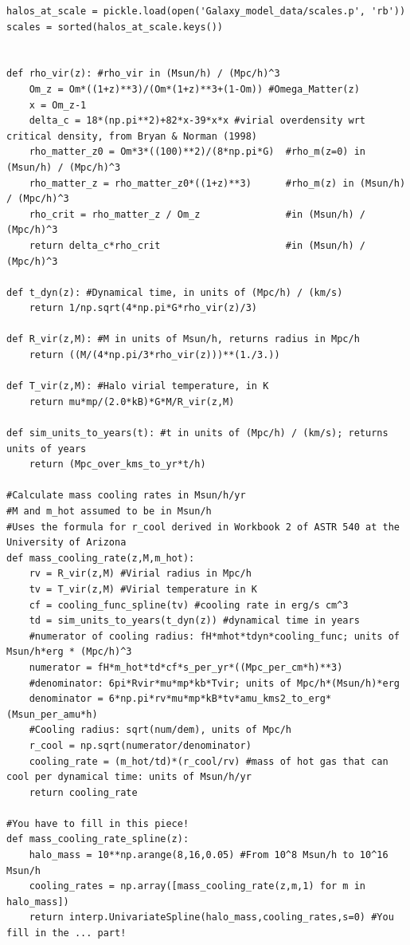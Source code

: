 \documentclass[onecolumn]{aastex62}
\begin{document}
\begin{verbatim}
halos_at_scale = pickle.load(open('Galaxy_model_data/scales.p', 'rb'))
scales = sorted(halos_at_scale.keys())


def rho_vir(z): #rho_vir in (Msun/h) / (Mpc/h)^3
    Om_z = Om*((1+z)**3)/(Om*(1+z)**3+(1-Om)) #Omega_Matter(z)
    x = Om_z-1
    delta_c = 18*(np.pi**2)+82*x-39*x*x #virial overdensity wrt critical density, from Bryan & Norman (1998)
    rho_matter_z0 = Om*3*((100)**2)/(8*np.pi*G)  #rho_m(z=0) in (Msun/h) / (Mpc/h)^3
    rho_matter_z = rho_matter_z0*((1+z)**3)      #rho_m(z) in (Msun/h) / (Mpc/h)^3
    rho_crit = rho_matter_z / Om_z               #in (Msun/h) / (Mpc/h)^3
    return delta_c*rho_crit                      #in (Msun/h) / (Mpc/h)^3

def t_dyn(z): #Dynamical time, in units of (Mpc/h) / (km/s)
    return 1/np.sqrt(4*np.pi*G*rho_vir(z)/3)

def R_vir(z,M): #M in units of Msun/h, returns radius in Mpc/h
    return ((M/(4*np.pi/3*rho_vir(z)))**(1./3.))

def T_vir(z,M): #Halo virial temperature, in K
    return mu*mp/(2.0*kB)*G*M/R_vir(z,M)

def sim_units_to_years(t): #t in units of (Mpc/h) / (km/s); returns units of years
    return (Mpc_over_kms_to_yr*t/h)

#Calculate mass cooling rates in Msun/h/yr
#M and m_hot assumed to be in Msun/h
#Uses the formula for r_cool derived in Workbook 2 of ASTR 540 at the University of Arizona
def mass_cooling_rate(z,M,m_hot):
    rv = R_vir(z,M) #Virial radius in Mpc/h
    tv = T_vir(z,M) #Virial temperature in K
    cf = cooling_func_spline(tv) #cooling rate in erg/s cm^3
    td = sim_units_to_years(t_dyn(z)) #dynamical time in years
    #numerator of cooling radius: fH*mhot*tdyn*cooling_func; units of Msun/h*erg * (Mpc/h)^3
    numerator = fH*m_hot*td*cf*s_per_yr*((Mpc_per_cm*h)**3)
    #denominator: 6pi*Rvir*mu*mp*kb*Tvir; units of Mpc/h*(Msun/h)*erg
    denominator = 6*np.pi*rv*mu*mp*kB*tv*amu_kms2_to_erg*(Msun_per_amu*h)
    #Cooling radius: sqrt(num/dem), units of Mpc/h
    r_cool = np.sqrt(numerator/denominator)
    cooling_rate = (m_hot/td)*(r_cool/rv) #mass of hot gas that can cool per dynamical time: units of Msun/h/yr
    return cooling_rate

#You have to fill in this piece!
def mass_cooling_rate_spline(z):
    halo_mass = 10**np.arange(8,16,0.05) #From 10^8 Msun/h to 10^16 Msun/h
    cooling_rates = np.array([mass_cooling_rate(z,m,1) for m in halo_mass])
    return interp.UnivariateSpline(halo_mass,cooling_rates,s=0) #You fill in the ... part!


\end{verbatim}
\end{document}

